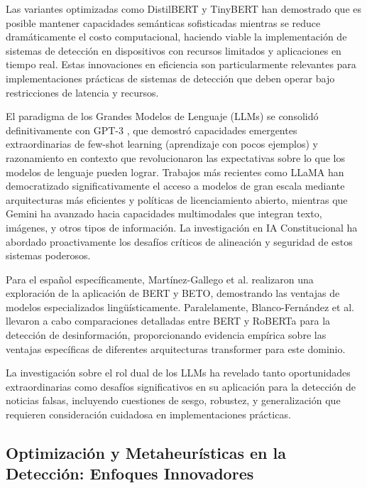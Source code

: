 Las variantes optimizadas como DistilBERT \cite{sanh2019distilbert} y TinyBERT \cite{jiao2019tinybert} han demostrado que es posible mantener capacidades semánticas sofisticadas mientras se reduce dramáticamente el costo computacional, haciendo viable la implementación de sistemas de detección en dispositivos con recursos limitados y aplicaciones en tiempo real. Estas innovaciones en eficiencia son particularmente relevantes para implementaciones prácticas de sistemas de detección que deben operar bajo restricciones de latencia y recursos.

El paradigma de los Grandes Modelos de Lenguaje (LLMs) se consolidó definitivamente con GPT-3 \cite{brown2020language}, que demostró capacidades emergentes extraordinarias de few-shot learning (aprendizaje con pocos ejemplos)  y razonamiento en contexto que revolucionaron las expectativas sobre lo que los modelos de lenguaje pueden lograr. Trabajos más recientes como LLaMA \cite{touvron2023llama} han democratizado significativamente el acceso a modelos de gran escala mediante arquitecturas más eficientes y políticas de licenciamiento abierto, mientras que Gemini \cite{gemini2023family} ha avanzado hacia capacidades multimodales que integran texto, imágenes, y otros tipos de información. La investigación en IA Constitucional \cite{bai2022constitutional} ha abordado proactivamente los desafíos críticos de alineación y seguridad de estos sistemas poderosos.

Para el español específicamente, Martínez-Gallego et al. \cite{martinez2021fake} realizaron una exploración de la aplicación de BERT y BETO, demostrando las ventajas de modelos especializados lingüísticamente. Paralelamente, Blanco-Fernández et al. \cite{blanco2024enhancing} llevaron a cabo comparaciones detalladas entre BERT y RoBERTa para la detección de desinformación, proporcionando evidencia empírica sobre las ventajas específicas de diferentes arquitecturas transformer para este dominio.

La investigación sobre el rol dual de los LLMs \cite{hu2024bad, su2023adapting, su2023fake} ha revelado tanto oportunidades extraordinarias como desafíos significativos en su aplicación para la detección de noticias falsas, incluyendo cuestiones de sesgo, robustez, y generalización que requieren consideración cuidadosa en implementaciones prácticas.

\subsection{Optimización y Metaheurísticas en la Detección: Enfoques Innovadores}

